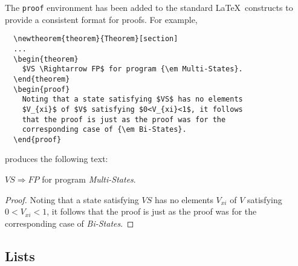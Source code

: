 The \verb"proof" environment has been added to the standard \LaTeX\
constructs to provide a consistent format for proofs.
For example,
%
\begin{verbatim}
  \newtheorem{theorem}{Theorem}[section]
  ...
  \begin{theorem}
    $VS \Rightarrow FP$ for program {\em Multi-States}.
  \end{theorem}
  \begin{proof}
    Noting that a state satisfying $VS$ has no elements
    $V_{xi}$ of $V$ satisfying $0<V_{xi}<1$, it follows
    that the proof is just as the proof was for the
    corresponding case of {\em Bi-States}.
  \end{proof}
\end{verbatim}
%
produces the following text:
%
  \begin{theorem}
    $VS \Rightarrow FP$ for program {\em Multi-States}.
  \end{theorem}
  \begin{proof}
    Noting that a state satisfying $VS$ has no elements
    $V_{xi}$ of $V$ satisfying $0<V_{xi}<1$, it follows
    that the proof is just as the proof was for the
    corresponding case of {\em Bi-States}.
  \end{proof}

\subsection{Lists}


